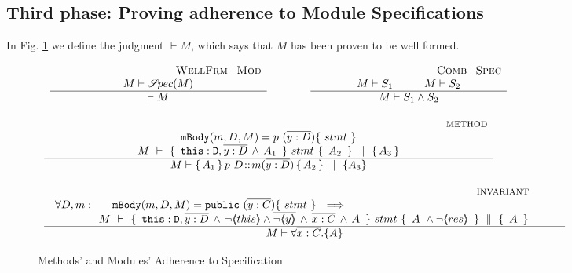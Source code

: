 \subsection{Third phase: Proving adherence to Module Specifications}
\label{sect:wf}

In Fig. \ref{f:wf} we  define the judgment $\vdash M$, which says that %
$M$ has been proven to be well formed. 



\begin{figure}[thb]
$
\begin{array}{l}
\begin{array}{lcl}
\inferruleSDNarrow 
{~ \strut  {\sc{WellFrm\_Mod}}}
{  M \vdash \SpecOf {M}
}
{
\vdash M  
}
& \hspace{0.7cm} &
\inferruleSDNarrow 
{~ \strut   {\sc{Comb\_Spec}}}
{  
M \vdash S_1 \hspace{1cm}  M \vdash S_2
}
{
M \vdash S_1 \wedge S_2
}
\end{array}
\\
\\
\inferruleSD 
{~ \strut \hspace{6.5cm} {\sc{method}}}
{  
 \prg{mBody}(m,D,M)=p \ (\overline{y:D})\{\  stmt \ \}  %
    \\
  {\hprovesN{M} { \ \prg{this}:\prg{D}, \overline{y:D}\, \wedge\, A_1\  } {\ stmt\ } {\ A_2 \ }   {A_3} } 
}
{
M \vdash {\mprepostN {A_1}{p\ D}{m}{y}{D}{A_2} {A_3} }
}
\\
\\
\inferruleSD 
{~ \strut \hspace{6.5cm} {\sc{invariant}}}
{  
\begin{array}{l}
\forall  D,  m:\ \ \  \ \  \prg{mBody}(m,D,M)=\prg{public} \ (\overline{y:C})\{\  stmt \ \}      \ \ \Longrightarrow  
    \\
   ~ \strut \hspace{0.7cm}  \ \ \ \  \  %
 {\hprovesN{M} { \ \prg{this}:\prg{D}, \overline{y:D}\, \wedge\, \neg\inside{this}\wedge\overline{ \neg\inside{y}}\, \wedge\, \overline{x:C}\, \wedge\,  A\  } {\ stmt\ } {\ A\ \wedge \neg\inside{res}\ } {\ A \ }  }\ \ \ \ \  \ \  
\end{array}
}
{
M \vdash \TwoStatesN{ \overline{x:C}} {A}
}
\end{array}
$
\caption{Methods' and Modules' Adherence to Specification}
\label{f:wf}
\end{figure}

